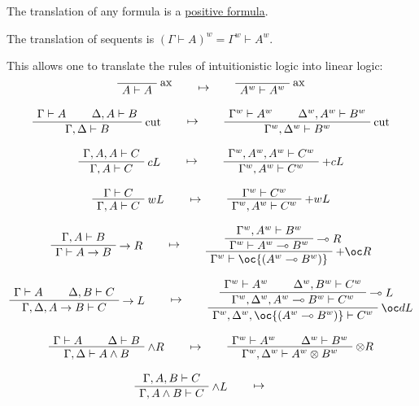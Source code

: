 The translation of any formula is a \hyperref[positive-formula]{positive formula}.

The translation of sequents is \((\Gamma\vdash A)^w = \Gamma^w\vdash A^w\).

This allows one to translate the rules of intuitionistic logic into linear logic:
\begin{gather*}
\LabelRule{\rulename{ax}}
\NulRule{A\vdash A}
\DisplayProof
\qquad\mapsto\qquad
\LabelRule{\rulename{ax}}
\NulRule{A^w\vdash A^w}
\DisplayProof
\\[2ex]
\AxRule{\Gamma\vdash A}
\AxRule{\Delta,A\vdash B}
\LabelRule{\rulename{cut}}
\BinRule{\Gamma,\Delta\vdash B}
\DisplayProof
\qquad\mapsto\qquad
\AxRule{\Gamma^w\vdash A^w}
\AxRule{\Delta^w,A^w\vdash B^w}
\LabelRule{\rulename{cut}}
\BinRule{\Gamma^w,\Delta^w\vdash B^w}
\DisplayProof
\\[2ex]
\AxRule{\Gamma,A,A\vdash C}
\LabelRule{c L}
\UnaRule{\Gamma,A\vdash C}
\DisplayProof
\qquad\mapsto\qquad
\AxRule{\Gamma^w,A^w,A^w\vdash C^w}
\LabelRule{+ c L}
\UnaRule{\Gamma^w,A^w\vdash C^w}
\DisplayProof
\\[2ex]
\AxRule{\Gamma\vdash C}
\LabelRule{w L}
\UnaRule{\Gamma,A\vdash C}
\DisplayProof
\qquad\mapsto\qquad
\AxRule{\Gamma^w\vdash C^w}
\LabelRule{+ w L}
\UnaRule{\Gamma^w,A^w\vdash C^w}
\DisplayProof
\\[2ex]
\AxRule{\Gamma,A\vdash B}
\LabelRule{\imp R}
\UnaRule{\Gamma\vdash A\imp B}
\DisplayProof
\qquad\mapsto\qquad
\AxRule{\Gamma^w,A^w\vdash B^w}
\LabelRule{\limp R}
\UnaRule{\Gamma^w\vdash A^w\limp B^w}
\LabelRule{+ \oc R}
\UnaRule{\Gamma^w\vdash \oc{(A^w\limp B^w)}}
\DisplayProof
\\[2ex]
\AxRule{\Gamma\vdash A}
\AxRule{\Delta,B\vdash C}
\LabelRule{\imp L}
\BinRule{\Gamma,\Delta,A\imp B\vdash C}
\DisplayProof
\qquad\mapsto\qquad
\AxRule{\Gamma^w\vdash A^w}
\AxRule{\Delta^w,B^w\vdash C^w}
\LabelRule{\limp L}
\BinRule{\Gamma^w,\Delta^w,A^w\limp B^w\vdash C^w}
\LabelRule{\oc d L}
\UnaRule{\Gamma^w,\Delta^w,\oc{(A^w\limp B^w)}\vdash C^w}
\DisplayProof
\\[2ex]
\AxRule{\Gamma\vdash A}
\AxRule{\Delta\vdash B}
\LabelRule{\wedge R}
\BinRule{\Gamma,\Delta\vdash A\wedge B}
\DisplayProof
\qquad\mapsto\qquad
\AxRule{\Gamma^w\vdash A^w}
\AxRule{\Delta^w\vdash B^w}
\LabelRule{\tens R}
\BinRule{\Gamma^w,\Delta^w\vdash A^w\tens B^w}
\DisplayProof
\\[2ex]
\AxRule{\Gamma,A,B\vdash C}
\LabelRule{\wedge L}
\UnaRule{\Gamma,A\wedge B\vdash C}
\DisplayProof
\qquad\mapsto\qquad
\AxRule{\Gamma^w,A^w,B^w\vdash C^w}

\end{gather*}
